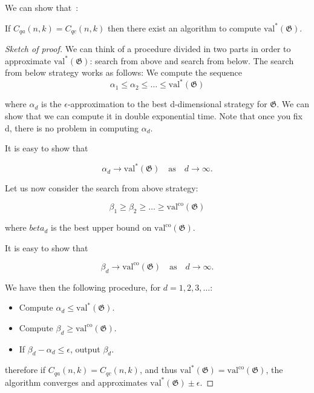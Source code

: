 We can show that~\cite{mipre}:

\begin{theorem}\label{th:tsirelon}
If $C_{q a}(n, k) = C_{q c}(n, k)$ then there exist an algorithm to compute $\operatorname{val^{*}}(\mathfrak{G})$.
\end{theorem}
\begin{proof}[Sketch of proof]
We can think of a procedure divided in two parts in order to approximate $\operatorname{val^{*}}(\mathfrak{G})$: search from above and search from below.
The search from below strategy works as follows:
We compute the sequence 
\begin{equation}
\alpha_1 \leq \alpha_2 \leq \dots \leq \operatorname{val^{*}}(\mathfrak{G})
\end{equation}
 
where $\alpha_d$ is the $\epsilon$-approximation to the best d-dimensional strategy for $\mathfrak{G}$. We can show that we can compute it in double exponential time.
Note that once you fix d, there is no problem in computing $\alpha_d$.

It is easy to show that 

\begin{equation}
\alpha_d \rightarrow \operatorname{val^{*}}(\mathfrak{G}) \quad \text{as} \quad d \rightarrow \infty.
\end{equation}

Let us now consider the search from above strategy:

\begin{equation}
\beta_1 \geq \beta_2 \geq \dots \geq \operatorname{val^{co}}(\mathfrak{G})
\end{equation}

where $beta_d$ is the best upper bound on $\operatorname{val^{co}}(\mathfrak{G})$.

It is easy to show that 

\begin{equation}
\beta_d \rightarrow \operatorname{val^{co}}(\mathfrak{G}) \quad \text{as} \quad d \rightarrow \infty.
\end{equation}

We have then the following procedure, for $d = 1,2,3, \dots$:

\begin{itemize}
\item Compute $\alpha_d \leq \operatorname{val^{*}}(\mathfrak{G})$.
\item Compute $\beta_d \geq \operatorname{val^{co}}(\mathfrak{G})$.
\item If $\beta_d - \alpha_d \leq \epsilon$, output $\beta_d$.
\end{itemize}

therefore if $C_{q a}(n, k) = C_{q c}(n, k)$, and thus $\operatorname{val^{*}}(\mathfrak{G}) =  \operatorname{val^{co}}(\mathfrak{G})$, the algorithm converges and approximates $\operatorname{val^{*}}(\mathfrak{G}) \pm \epsilon$.
\end{proof}



